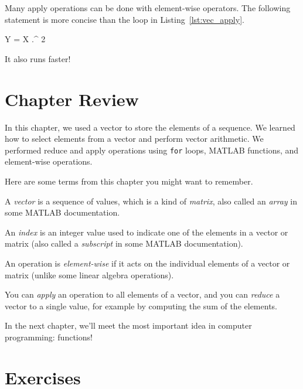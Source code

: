 Many apply operations can be done with element-wise operators.
The following statement is more concise than the loop in
Listing~\ref{lst:vec_apply}.

\begin{code}
Y = X .^ 2
\end{code}

It also runs faster!


\section{Chapter Review}

In this chapter, we used a vector to store the elements of a sequence.  We learned how to select elements from a vector and perform vector arithmetic.  We performed reduce and apply operations using \lstinline{for} loops, MATLAB functions, and element-wise operations.

Here are some terms from this chapter you might want to remember.


A \emph{vector} is a sequence of values, which is a kind of \emph{matrix}, also called an \emph{array} in some MATLAB documentation.

An \emph{index} is an integer value used to indicate one of the elements
in a vector or matrix (also called a \emph{subscript} in some MATLAB documentation).

An operation is \emph{element-wise} if it acts on the individual elements of a vector or matrix (unlike some linear algebra operations).

You can \emph{apply} an operation to all elements of a vector, and you can \mbox{\emph{reduce}} a vector to a single value, for example by computing the sum of the elements.


In the next chapter, we'll meet the most important idea in computer programming: functions!



\section{Exercises}

